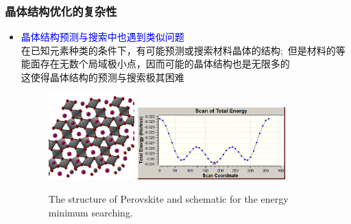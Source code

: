 \documentclass[cjk,slidestop,compress,mathserif,blue]{beamer}
\begin{document}
\frame
{
	\frametitle{晶体结构优化的复杂性}
	\begin{itemize}
		\item \textcolor{blue}{晶体结构预测与搜索中也遇到类似问题}\\
		在已知元素种类的条件下，有可能预测或搜索材料晶体的结构;~但是材料的等能面存在无数个局域极小点，因而可能的晶体结构也是无限多的\\
		这使得晶体结构的预测与搜索极其困难
\begin{figure}[h!]
\centering
\includegraphics[height=1.3in,width=1.3in]{Figures/Struct-predict-3.png}
\hskip 1.0pt
\includegraphics[height=1.1in,width=2.25in]{Figures/Total_energy_opt.png}
\caption{\tiny \textrm{The structure of Perovskite and schematic for the energy minimum searching.}}%
\label{Fig:Structure-optimized}
\end{figure}
	\end{itemize}
}
\end{document}
